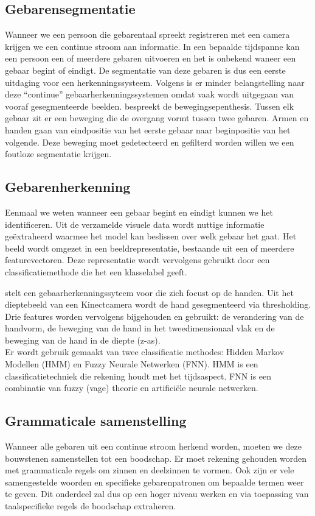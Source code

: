 \subsection{Gebarensegmentatie}
\npar Wanneer we een persoon die gebarentaal spreekt registreren met een camera krijgen we een continue stroom aan informatie. In een bepaalde tijdspanne kan een persoon een of meerdere gebaren uitvoeren en het is onbekend waneer een gebaar begint of eindigt. De segmentatie van deze gebaren is dus een eerste uitdaging voor een herkenningssysteem. Volgens \cite{hmdb-manual-segm} is er minder belangstelling naar deze ``continue'' gebaarherkenningssystemen omdat vaak wordt uitgegaan van vooraf gesegmenteerde beelden.
\npar  \cite{movement-epenthesis} bespreekt de bewegingsepenthesis. Tussen elk gebaar zit er een beweging die de overgang vormt tussen twee gebaren. Armen en handen gaan van eindpositie van het eerste gebaar naar beginpositie van het volgende. Deze beweging moet gedetecteerd en gefilterd worden willen we een foutloze segmentatie krijgen.

\subsection{Gebarenherkenning}
Eenmaal we weten wanneer een gebaar begint en eindigt kunnen we het identificeren. Uit de verzamelde visuele data wordt nuttige informatie ge\"extraheerd waarmee het model kan beslissen over welk gebaar het gaat. Het beeld wordt omgezet in een beeldrepresentatie, bestaande uit een of meerdere featurevectoren. Deze representatie wordt vervolgens gebruikt door een classificatiemethode die het een klasselabel geeft.

\npar \cite{gesture-FNN-HMM} stelt een gebaarherkenningssyteem voor die zich focust op de handen. Uit het dieptebeeld van een Kinectcamera wordt de hand gesegmenteerd via thresholding. Drie features worden vervolgens bijgehouden en gebruikt: de verandering van de handvorm, de beweging van de hand in het tweedimensionaal vlak en de beweging van de hand in de diepte (z-as).
\\Er wordt gebruik gemaakt van twee classificatie methodes: Hidden Markov Modellen (HMM) en Fuzzy Neurale Netwerken (FNN). HMM is een classificatietechniek die rekening houdt met het tijdsaspect. FNN is een combinatie van fuzzy (vage) theorie en artifici\"ele neurale netwerken.

\subsection{Grammaticale samenstelling}
Wanneer alle gebaren uit een continue stroom herkend worden, moeten we deze bouwstenen samenstellen tot een boodschap. Er moet rekening gehouden worden met grammaticale regels om zinnen en deelzinnen te vormen. Ook zijn er vele samengestelde woorden en specifieke gebarenpatronen om bepaalde termen weer te geven. Dit onderdeel zal dus op een hoger niveau werken en via toepassing van taalspecifieke regels de boodschap extraheren.
%

